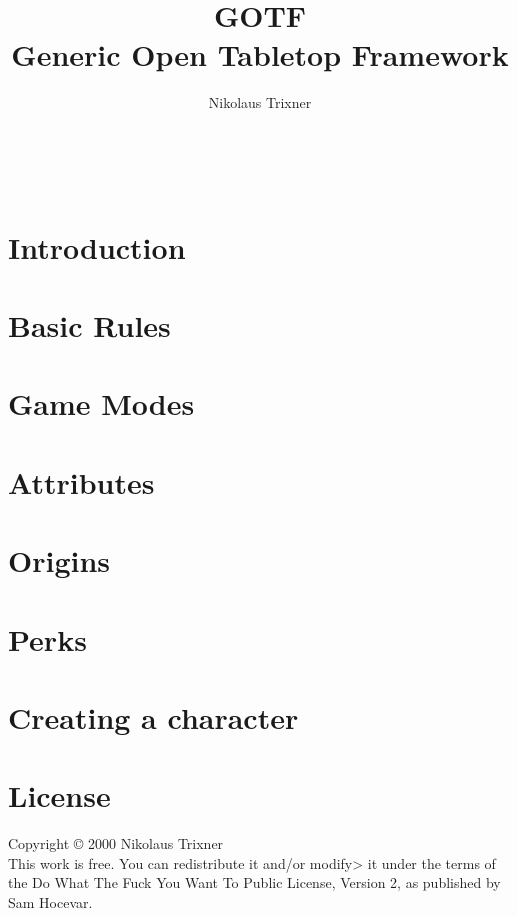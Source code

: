 \documentclass[a4paper]{book}
\begin{document}
	\title{GOTF \\ Generic Open Tabletop Framework}
	\
	\author{Nikolaus Trixner}

	\maketitle

	\tableofcontents

	\part{Introduction}\label{part:intrudction}
	


	\part{Basic Rules}\label{part:basicRules}
	

	\part{Game Modes}\label{part:gameModes}
	
	
	\part{Attributes}\label{part:attributes}
	
	
	

	\part{Origins}\label{part:origins}
	
	
	

	\part{Perks}\label{part:perks}
	
	
	
	
	
	

	\part{Creating a character}\label{part:characterCreation}
	


	\part{License}\label{part:license}
	Copyright © 2000 Nikolaus Trixner\\
	This work is free.
	You can redistribute it and/or modify> it under the  terms of the Do What The Fuck You Want To Public License, Version 2, as published by Sam Hocevar.
\end{document}
